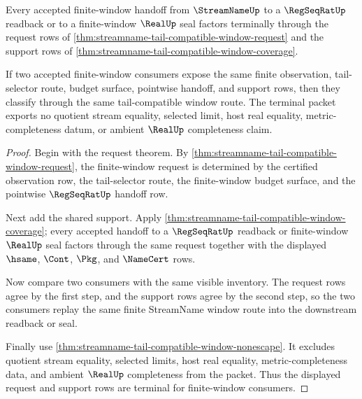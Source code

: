 \begin{theorem}
\label{thm:streamname-tail-compatible-window-terminality}
Every accepted finite-window handoff from $\StreamNameUp$ to a $\RegSeqRatUp$
readback or to a finite-window $\RealUp$ seal factors terminally through the
request rows of \autoref{thm:streamname-tail-compatible-window-request} and
the support rows of \autoref{thm:streamname-tail-compatible-window-coverage}.

If two accepted finite-window consumers expose the same finite observation,
tail-selector route, budget surface, pointwise handoff, and support rows, then
they classify through the same tail-compatible window route. The terminal
packet exports no quotient stream equality, selected limit, host real equality,
metric-completeness datum, or ambient $\RealUp$ completeness claim.
\end{theorem}
\begin{proof}
Begin with the request theorem. By
\autoref{thm:streamname-tail-compatible-window-request}, the finite-window
request is determined by the certified observation row, the tail-selector
route, the finite-window budget surface, and the pointwise $\RegSeqRatUp$
handoff row.

Next add the shared support. Apply
\autoref{thm:streamname-tail-compatible-window-coverage}; every accepted
handoff to a $\RegSeqRatUp$ readback or finite-window $\RealUp$ seal factors
through the same request together with the displayed $\hsame$, $\Cont$,
$\Pkg$, and $\NameCert$ rows.

Now compare two consumers with the same visible inventory. The request rows
agree by the first step, and the support rows agree by the second step, so the
two consumers replay the same finite StreamName window route into the
downstream readback or seal.

Finally use \autoref{thm:streamname-tail-compatible-window-nonescape}. It
excludes quotient stream equality, selected limits, host real equality,
metric-completeness data, and ambient $\RealUp$ completeness from the packet.
Thus the displayed request and support rows are terminal for finite-window
consumers.
\end{proof}

